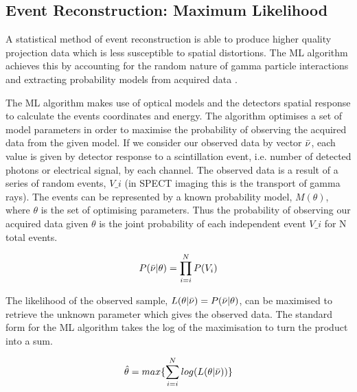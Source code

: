 \subsection{Event Reconstruction: Maximum Likelihood}
A statistical method of event reconstruction is able  to produce higher quality projection data which is less susceptible to spatial distortions. The \acrlong{ML} algorithm achieves this by accounting for the random nature of gamma particle interactions and extracting probability models from acquired data \cite{4307558} \cite{JinhunJoung2000ImplementationCameras}.

The \acrshort{ML} algorithm makes use of optical models and the detectors spatial response to calculate the events coordinates and energy. The algorithm optimises a set of model parameters in order to maximise the probability of observing the acquired data from the given model. If we consider our observed data by vector $\Bar{\nu}$, each value is given by detector response to a scintillation event, i.e. number of detected photons or electrical signal, by each channel. The observed data is a result of a series of random events, $V\_i$ (in SPECT imaging this is the transport of gamma rays). The events can be represented by a known probability model, $M(\theta)$, where $\theta$ is the set of optimising parameters. Thus the probability of observing our acquired data given $\theta$ is the joint probability of each independent event $V\_i$ for N total events. 

\begin{equation} \label{eqn:MLProb}
                P(\Bar{\nu}|\theta) = \prod^{N}_{i=i}P(V_i)
\end{equation}

The likelihood of the observed sample, $L(\theta|\Bar{\nu}) = P(\Bar{\nu}|\theta)$, can be maximised to retrieve the unknown parameter which gives the observed data. The standard form for the \acrshort{ML} algorithm takes the log of the maximisation to turn the product into a sum. 

\begin{equation} \label{eqn:ML}
                \hat{\theta} = max\{\sum^{N}_{i=i}log(L(\theta|\Bar{\nu}))\}
\end{equation}


